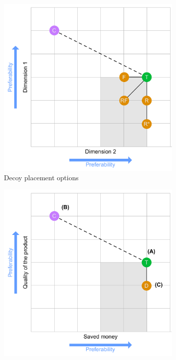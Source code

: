 \begin{figure}[t]
	\centering
	\begin{subfigure}[t]{0.49\textwidth}
		\includegraphics[width=\textwidth]{figures/decoy/decoy-dimensions-general}
		\caption{Decoy placement options \cite{Huber1982AsymetricallyDominated}}
		\label{fig:decoy:general-construction} 
	\end{subfigure}
	\begin{subfigure}[t]{0.49\textwidth}
		\includegraphics[width=\textwidth]{figures/decoy/decoy-dimensions-beer}

\end{subfigure}
\end{figure}

